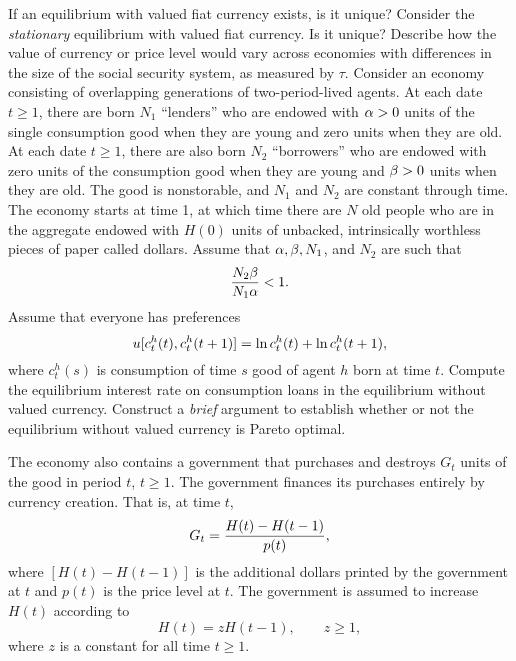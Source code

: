 \medskip{} If an equilibrium with valued fiat currency exists, is it unique?
\medskip{}
 Consider the {\it stationary\/} equilibrium with valued fiat currency.
Is it unique? Describe how the value of currency or price level would vary
across economies with differences in the size of the social security system, as
measured by $\tau$.
\medskip
{}
\medskip
\noindent Consider an economy consisting of overlapping generations of two-period-lived
agents.  At each date $t\ge 1$, there are born $N_1$ ``lenders'' who are
endowed with $\alpha>0$ units of the single consumption good when they are young
and zero units when they are old.  At each date $t\ge 1$, there are also born
$N_2$ ``borrowers'' who are endowed with zero units of the consumption good
when they are young and ${\beta}>0$ units when they are old.  The good is
nonstorable, and $N_1$ and $N_2$ are constant through time.  The economy starts
at time 1, at which time there are $N$ old people who are in the aggregate
endowed with $H(0)$ units of unbacked, intrinsically worthless pieces of paper
called dollars.  Assume that $\alpha,{\beta},N_1$, and $N_2$ are such that
$${N_2{\beta}\over N_1\alpha} <1.$$
Assume that everyone has preferences
$$u[c_t^h(t), c_t^h({t+1})]=\mathop{\hbox{ln}} c_t^h(t) +\mathop{\hbox{ln}} c_t^h({t+1}),$$
where $c_t^h(s)$ is consumption of time $s$ good of agent $h$ born at time $t$.
\medskip{} Compute the equilibrium interest rate on consumption loans in the
equilibrium without valued currency.
\medskip{} Construct a {\it brief\/} argument to establish whether or not the
equilibrium without valued currency is Pareto optimal.

The economy also contains a government that purchases and destroys $G_t$ units
of the good in period $t$, $t\ge 1$.  The government finances its purchases
entirely by currency creation.  That is, at time $t$,
$$G_t ={H(t)-H(t-1)\over p(t)},$$
where $[H(t)-H(t-1)]$ is the additional dollars printed by the government at
$t$ and $p(t)$ is the price level at $t$.  The government is assumed to
increase $H(t)$ according to
$$H(t)=zH(t-1),\qquad z\ge 1,$$
where $z$ is a constant for all time $t\ge 1$.

